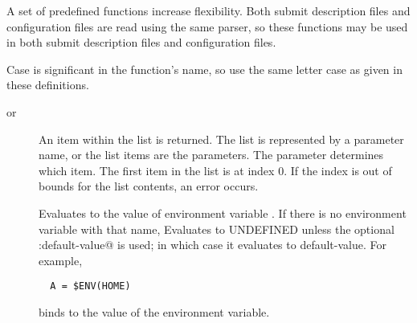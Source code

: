 
A set of predefined functions increase flexibility.
Both submit description files and configuration files are read using
the same parser,
so these functions may be used in both submit description files and
configuration files.

Case is significant in the function's name, so use the
same letter case as given in these definitions.

\begin{description}

\item [ 
       or ]
An item within the list is returned.
The list is represented by a parameter name,
or the list items are the parameters.
The  parameter determines which item.
The first item in the list is at index 0.
If the index is out of bounds for the list contents, 
an error occurs.


\item []
Evaluates to the value of environment variable 
. If there is no environment variable with that name, Evaluates
to UNDEFINED unless the optional \Verb@:default-value@ is used; in which case it evaluates to default-value.
For example, 
\begin{verbatim}
  A = $ENV(HOME)
\end{verbatim}
binds  to the value of the  environment variable.


\end{description}
